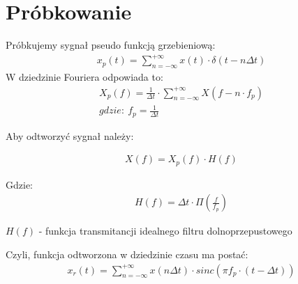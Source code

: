  \newpage
 \section{Próbkowanie}
    \tab Próbkujemy sygnał pseudo funkcją grzebieniową:
    \begin{gather*}
        x_p(t) = \sum_{n=-\infty}^{+\infty}x(t)\cdot \delta(t-n\Delta t)
    \end{gather*}
    W dziedzinie Fouriera odpowiada to:
    \begin{gather*}
        X_p(f) = \frac{1}{\Delta t} \cdot \sum_{n=-\infty}^{+\infty} X(f-n\cdot f_p)\\
        gdzie:\ f_p = \frac{1}{\Delta t}
    \end{gather*}

    \noindent Aby odtworzyć sygnał należy:
    \begin{multicols}{2}
        \begin{gather*}
            X(f) = X_p(f)\cdot H(f)
        \end{gather*}
        
        Gdzie:
        \begin{gather*}
            H(f) = \Delta t \cdot\Pi\left(\frac{f}{f_p}\right)
        \end{gather*}
    \end{multicols}
    \begin{center}
        $H(f)$ - funkcja transmitancji idealnego filtru dolnoprzepustowego
    \end{center}
    Czyli, funkcja odtworzona w dziedzinie czasu ma postać:
    \begin{gather*}
        x_r(t) = \sum_{n=-\infty}^{+\infty} x(n\Delta t) \cdot sinc(\pi f_p \cdot
        (t-\Delta t))
    \end{gather*}
    
